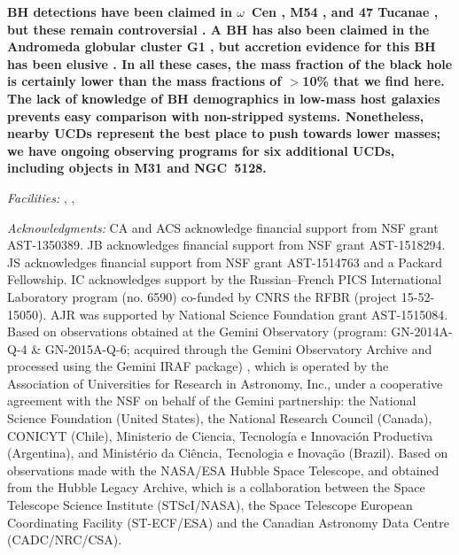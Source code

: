 \documentclass{aastex}
\begin{document}
\textbf{BH detections have been claimed in $\omega$~Cen \citep[e.g.][]{noyola10,baumgardt17}, M54 \citep{ibata09}, and 47 Tucanae \citep{kiziltan17}, but these remain controversial \citep{vandermarel10,haggard13}.  A BH has also been claimed in the Andromeda globular cluster G1 \citep{gebhardt05}, but accretion evidence for this BH has been elusive \citep{miller-jones12}.  In all these cases, the mass fraction of the black hole is certainly lower than the mass fractions of $>$10\% that we find here.  The lack of knowledge of BH demographics in low-mass host galaxies prevents easy comparison with non-stripped systems. Nonetheless, nearby UCDs represent the best place to push towards lower masses; we have ongoing observing programs for six additional UCDs, including objects in M31 and NGC~5128.}

{\it Facilities:} ,
, 

{\em Acknowledgments:}  CA and ACS acknowledge financial support from NSF grant AST-1350389.  JB acknowledges financial support from NSF grant AST-1518294.  JS acknowledges financial support from NSF grant AST-1514763 and a Packard Fellowship. IC acknowledges support by the Russian–French PICS International Laboratory program (no. 6590) co-funded by CNRS the RFBR (project 15-52-15050).  AJR was supported by National Science Foundation grant AST-1515084.
Based on observations obtained at the Gemini Observatory (program: GN-2014A-Q-4 \& GN-2015A-Q-6; acquired through the Gemini Observatory Archive and processed using the Gemini IRAF package) , which is operated by the Association of Universities for Research in Astronomy, Inc., under a cooperative agreement with the NSF on behalf of the Gemini partnership: the National Science Foundation (United States), the National Research Council (Canada), CONICYT (Chile), Ministerio de Ciencia, Tecnolog\'{i}a e Innovaci\'{o}n Productiva (Argentina), and Minist\'{e}rio da Ci\^{e}ncia, Tecnologia e Inova\c{c}\~{a}o (Brazil).   Based on observations made with the NASA/ESA Hubble Space Telescope, and obtained from the Hubble Legacy Archive, which is a collaboration between the Space Telescope Science Institute (STScI/NASA), the Space Telescope European Coordinating Facility (ST-ECF/ESA) and the Canadian Astronomy Data Centre (CADC/NRC/CSA). 


\end{document}
